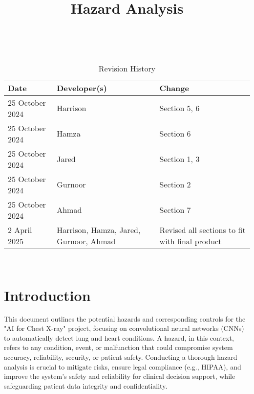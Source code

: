 \documentclass{article}
\title{Hazard Analysis\\\progname}
\author{\authname}
\date{}
\begin{document}
\maketitle
\thispagestyle{empty}
~\newpage
\tableofcontents 
~\newpage


\begin{table}[hp]
  \caption{Revision History} \label{TblRevisionHistory}
  \begin{tabularx}{\textwidth}{llX}
    \toprule
    \textbf{Date} & \textbf{Developer(s)} & \textbf{Change}\\
    \midrule
    25 October 2024 & Harrison & Section 5, 6 \\
    25 October 2024 & Hamza & Section 6 \\
    25 October 2024 & Jared & Section 1, 3 \\
    25 October 2024 & Gurnoor & Section 2 \\
    25 October 2024 & Ahmad & Section 7\\
    2 April 2025 & Harrison, Hamza, Jared, Gurnoor, Ahmad & Revised all sections to fit with final product\\
    \bottomrule
  \end{tabularx}
\end{table}

~\newpage


\section{Introduction}


This document outlines the potential hazards and corresponding controls for the "AI for Chest X-ray" project, focusing on convolutional neural networks (CNNs) to automatically detect lung and heart conditions. A hazard, in this context, refers to any condition, event, or malfunction that could compromise system accuracy, reliability, security, or patient safety. Conducting a thorough hazard analysis is crucial to mitigate risks, ensure legal compliance (e.g., HIPAA), and improve the system's safety and reliability for clinical decision support, while safeguarding patient data integrity and confidentiality.
\end{document}
